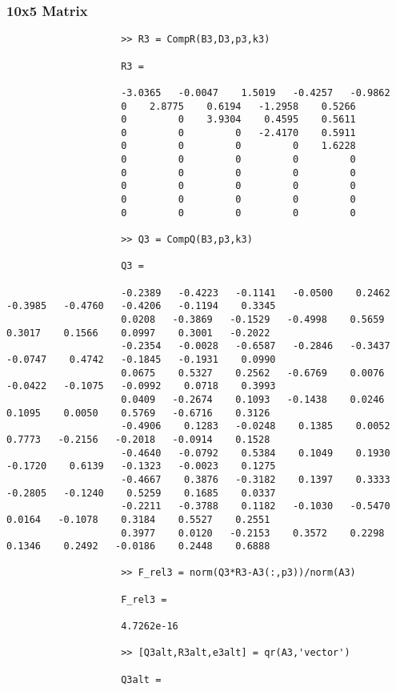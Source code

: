 \documentclass[11pt,titlepage]{article}
\begin{document}
			\subsubsection{10x5 Matrix}
				\begin{lstlisting}
					>> R3 = CompR(B3,D3,p3,k3)
					
					R3 =
					
					-3.0365   -0.0047    1.5019   -0.4257   -0.9862
					0    2.8775    0.6194   -1.2958    0.5266
					0         0    3.9304    0.4595    0.5611
					0         0         0   -2.4170    0.5911
					0         0         0         0    1.6228
					0         0         0         0         0
					0         0         0         0         0
					0         0         0         0         0
					0         0         0         0         0
					0         0         0         0         0
					
					>> Q3 = CompQ(B3,p3,k3)
					
					Q3 =
					
					-0.2389   -0.4223   -0.1141   -0.0500    0.2462   -0.3985   -0.4760   -0.4206   -0.1194    0.3345
					0.0208   -0.3869   -0.1529   -0.4998    0.5659    0.3017    0.1566    0.0997    0.3001   -0.2022
					-0.2354   -0.0028   -0.6587   -0.2846   -0.3437   -0.0747    0.4742   -0.1845   -0.1931    0.0990
					0.0675    0.5327    0.2562   -0.6769    0.0076   -0.0422   -0.1075   -0.0992    0.0718    0.3993
					0.0409   -0.2674    0.1093   -0.1438    0.0246    0.1095    0.0050    0.5769   -0.6716    0.3126
					-0.4906    0.1283   -0.0248    0.1385    0.0052    0.7773   -0.2156   -0.2018   -0.0914    0.1528
					-0.4640   -0.0792    0.5384    0.1049    0.1930   -0.1720    0.6139   -0.1323   -0.0023    0.1275
					-0.4667    0.3876   -0.3182    0.1397    0.3333   -0.2805   -0.1240    0.5259    0.1685    0.0337
					-0.2211   -0.3788    0.1182   -0.1030   -0.5470    0.0164   -0.1078    0.3184    0.5527    0.2551
					0.3977    0.0120   -0.2153    0.3572    0.2298    0.1346    0.2492   -0.0186    0.2448    0.6888
					
					>> F_rel3 = norm(Q3*R3-A3(:,p3))/norm(A3)
					
					F_rel3 =
					
					4.7262e-16
					
					>> [Q3alt,R3alt,e3alt] = qr(A3,'vector')
					
					Q3alt =
					

\end{lstlisting}
\end{document}
